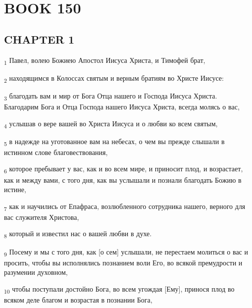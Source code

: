 \section{BOOK 150}
\subsection{CHAPTER 1}
\begin{tcolorbox}
\textsubscript{1} Павел, волею Божиею Апостол Иисуса Христа, и Тимофей брат,
\end{tcolorbox}
\begin{tcolorbox}
\textsubscript{2} находящимся в Колоссах святым и верным братиям во Христе Иисусе:
\end{tcolorbox}
\begin{tcolorbox}
\textsubscript{3} благодать вам и мир от Бога Отца нашего и Господа Иисуса Христа. Благодарим Бога и Отца Господа нашего Иисуса Христа, всегда молясь о вас,
\end{tcolorbox}
\begin{tcolorbox}
\textsubscript{4} услышав о вере вашей во Христа Иисуса и о любви ко всем святым,
\end{tcolorbox}
\begin{tcolorbox}
\textsubscript{5} в надежде на уготованное вам на небесах, о чем вы прежде слышали в истинном слове благовествования,
\end{tcolorbox}
\begin{tcolorbox}
\textsubscript{6} которое пребывает у вас, как и во всем мире, и приносит плод, и возрастает, как и между вами, с того дня, как вы услышали и познали благодать Божию в истине,
\end{tcolorbox}
\begin{tcolorbox}
\textsubscript{7} как и научились от Епафраса, возлюбленного сотрудника нашего, верного для вас служителя Христова,
\end{tcolorbox}
\begin{tcolorbox}
\textsubscript{8} который и известил нас о вашей любви в духе.
\end{tcolorbox}
\begin{tcolorbox}
\textsubscript{9} Посему и мы с того дня, как [о сем] услышали, не перестаем молиться о вас и просить, чтобы вы исполнялись познанием воли Его, во всякой премудрости и разумении духовном,
\end{tcolorbox}
\begin{tcolorbox}
\textsubscript{10} чтобы поступали достойно Бога, во всем угождая [Ему], принося плод во всяком деле благом и возрастая в познании Бога,
\end{tcolorbox}
